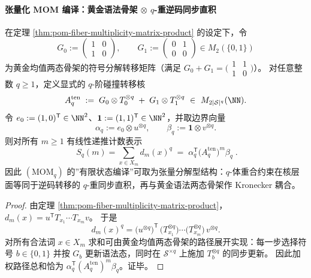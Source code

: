 \paragraph{张量化 MOM 编译：黄金语法骨架 \texorpdfstring{$\otimes$}{x} \(q\)-重逆码同步直积}
\begin{proposition}\label{prop:pom-momq-tensor-kernel-construction}
在定理 \ref{thm:pom-fiber-multiplicity-matrix-product} 的设定下，令
\[
G_0:=\begin{pmatrix}1&0\\[2pt]1&0\end{pmatrix},
\qquad
G_1:=\begin{pmatrix}0&1\\[2pt]0&0\end{pmatrix}
\in M_2(\{0,1\})
\]
为黄金均值两态骨架的符号分解转移矩阵（满足 \(G_0+G_1=\bigl(\begin{smallmatrix}1&1\\1&0\end{smallmatrix}\bigr)\)）。
对任意整数 \(q\ge 1\)，定义显式的 \(q\)-阶碰撞转移核
\[
A_q^{\mathrm{ten}}
\;:=\;
G_0\otimes T_0^{\otimes q}\;+\;G_1\otimes T_1^{\otimes q}
\ \in\ M_{2|\mathcal S|^q}(\NN).
\]
令 \(e_0:=(1,0)^{\mathsf T}\in\NN^2\)、\(\mathbf 1:=(1,1)^{\mathsf T}\in\NN^2\)，并取边界向量
\[
\alpha_q:=e_0\otimes u^{\otimes q},
\qquad
\beta_q:=\mathbf 1\otimes v^{\otimes q}.
\]
则对所有 \(m\ge 1\) 有线性递推计数表示
\[
\boxed{\;
S_q(m)=\sum_{x\in X_m}d_m(x)^q
\;=\;
\alpha_q^{\mathsf T}\bigl(A_q^{\mathrm{ten}}\bigr)^{m}\beta_q\; }.
\]
因此 \((\mathrm{MOM}_q)\) 的”有限状态编译”可取为张量分解型结构：\(q\)-体重合约束在核层面等同于逆码转移的 \(q\)-重同步直积，再与黄金语法两态骨架作 Kronecker 耦合。
\end{proposition}
\begin{proof}
由定理 \ref{thm:pom-fiber-multiplicity-matrix-product}，
\(
d_m(x)=u^{\mathsf T}T_{x_1}\cdots T_{x_m}v
\)。
于是
\[
d_m(x)^q
=
\bigl(u^{\otimes q}\bigr)^{\mathsf T}\,
\bigl(T_{x_1}^{\otimes q}\bigr)\cdots
\bigl(T_{x_m}^{\otimes q}\bigr)\,
v^{\otimes q}.
\]
对所有合法词 \(x\in X_m\) 求和可由黄金均值两态骨架的路径展开实现：每一步选择符号 \(b\in\{0,1\}\) 并按 \(G_b\) 更新语法态，同时在 \(\mathcal S^{\times q}\) 上施加 \(T_b^{\otimes q}\) 的同步更新。
因此加权路径总和恰为 \(\alpha_q^{\mathsf T}(A_q^{\mathrm{ten}})^m\beta_q\)。证毕。
\end{proof}

